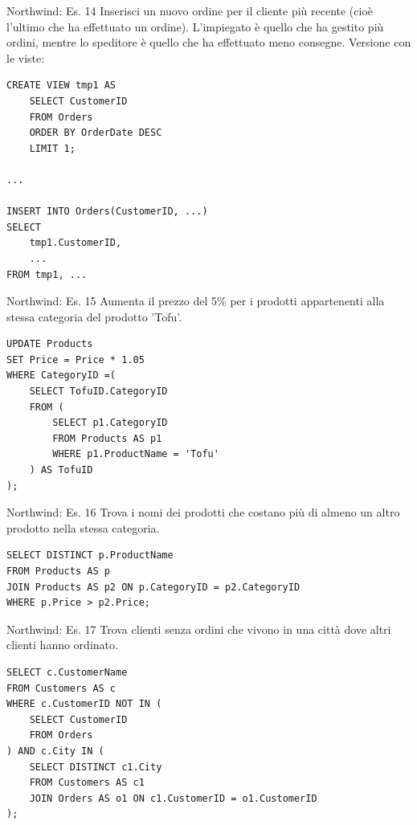 \begin{frame}[fragile]{Northwind: Es. 14}
Inserisci un nuovo ordine per il cliente pi\`u recente (cio\`e l'ultimo che ha effettuato un ordine). 
L'impiegato \`e quello che ha gestito pi\`u ordini, mentre lo speditore \`e quello che ha effettuato 
meno consegne.
\newline
\newline
Versione con le viste:
\begin{lstlisting}[basicstyle=\scriptsize\ttfamily]
CREATE VIEW tmp1 AS
	SELECT CustomerID
    FROM Orders
    ORDER BY OrderDate DESC
    LIMIT 1;

...

INSERT INTO Orders(CustomerID, ...)
SELECT
	tmp1.CustomerID,
    ...
FROM tmp1, ...
\end{lstlisting}
\end{frame}
%
\begin{frame}[fragile]{Northwind: Es. 15}
Aumenta il prezzo del 5\% per i prodotti appartenenti alla stessa categoria del prodotto 'Tofu'.
\pause
\begin{lstlisting}
UPDATE Products
SET Price = Price * 1.05
WHERE CategoryID =(
    SELECT TofuID.CategoryID
    FROM (
        SELECT p1.CategoryID
        FROM Products AS p1
        WHERE p1.ProductName = 'Tofu'
    ) AS TofuID
);
\end{lstlisting}
\end{frame}
%
\begin{frame}[fragile]{Northwind: Es. 16}
Trova i nomi dei prodotti che costano pi\`u di almeno un altro prodotto nella stessa categoria.
\pause
\begin{lstlisting}
SELECT DISTINCT p.ProductName
FROM Products AS p
JOIN Products AS p2 ON p.CategoryID = p2.CategoryID
WHERE p.Price > p2.Price;
\end{lstlisting}
\end{frame}
%
\begin{frame}[fragile]{Northwind: Es. 17}
Trova clienti senza ordini che vivono in una citt\`a dove altri clienti hanno ordinato.
\pause
\begin{lstlisting}
SELECT c.CustomerName
FROM Customers AS c
WHERE c.CustomerID NOT IN (
	SELECT CustomerID
    FROM Orders
) AND c.City IN (
	SELECT DISTINCT c1.City
    FROM Customers AS c1
    JOIN Orders AS o1 ON c1.CustomerID = o1.CustomerID
);
\end{lstlisting}
\end{frame}

